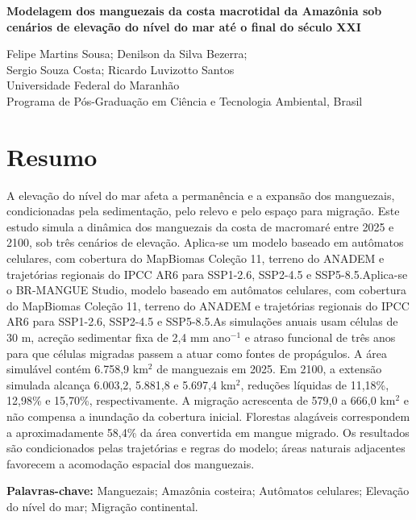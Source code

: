 \documentclass[12pt,a4paper]{article}
\newcommand{\tituloPT}{Modelagem dos manguezais da costa macrotidal da Amazônia sob cenários de elevação do nível do mar até o final do século XXI}
\begin{document}
\begin{center}
{\Large\bfseries\tituloPT\par}
\vspace{0.7em}
\ifdefined\VersaoCega\else
Felipe Martins Sousa; Denilson da Silva Bezerra;\\
Sergio Souza Costa; Ricardo Luvizotto Santos\\[0.35em]
{\small Universidade Federal do Maranhão\\
Programa de Pós-Graduação em Ciência e Tecnologia Ambiental, Brasil}
\fi
\end{center}

\section*{Resumo}
A elevação do nível do mar afeta a permanência e a expansão dos manguezais, condicionadas pela sedimentação, pelo relevo e pelo espaço para migração. Este estudo simula a dinâmica dos manguezais da costa de macromaré entre 2025 e 2100, sob três cenários de elevação. \ifdefined\VersaoCega Aplica-se um modelo baseado em autômatos celulares, com cobertura do MapBiomas Coleção 11, terreno do ANADEM e trajetórias regionais do IPCC AR6 para SSP1-2.6, SSP2-4.5 e SSP5-8.5.\else Aplica-se o BR-MANGUE Studio, modelo baseado em autômatos celulares, com cobertura do MapBiomas Coleção 11, terreno do ANADEM e trajetórias regionais do IPCC AR6 para SSP1-2.6, SSP2-4.5 e SSP5-8.5.\fi\space As simulações anuais usam células de 30 m, acreção sedimentar fixa de 2,4 mm ano$^{-1}$ e atraso funcional de três anos para que células migradas passem a atuar como fontes de propágulos. A área simulável contém 6.758,9 km$^2$ de manguezais em 2025. Em 2100, a extensão simulada alcança 6.003,2, 5.881,8 e 5.697,4 km$^2$, reduções líquidas de 11,18\%, 12,98\% e 15,70\%, respectivamente. A migração acrescenta de 579,0 a 666,0 km$^2$ e não compensa a inundação da cobertura inicial. Florestas alagáveis correspondem a aproximadamente 58,4\% da área convertida em mangue migrado. Os resultados são condicionados pelas trajetórias e regras do modelo; áreas naturais adjacentes favorecem a acomodação espacial dos manguezais.

\noindent\textbf{Palavras-chave:} Manguezais; Amazônia costeira; Autômatos celulares; Elevação do nível do mar; Migração continental.
\end{document}
